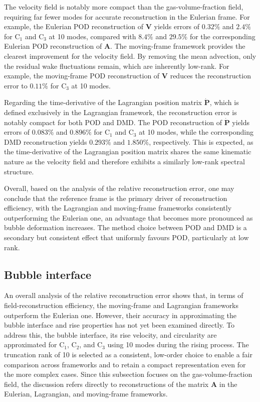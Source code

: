 \documentclass[a4paper,fleqn]{cas-sc}
\begin{document}
	The velocity field is notably more compact than the gas-volume-fraction field, requiring far fewer modes for accurate reconstruction in the Eulerian frame. For example, the Eulerian POD reconstruction of $\mathbf{V}$ yields errors of $0.32\%$ and $2.4\%$ for C$_1$ and C$_3$ at 10 modes, compared with $8.4\%$ and $29.5\%$ for the corresponding Eulerian POD reconstruction of $\mathbf{A}$. The moving-frame framework provides the clearest improvement for the velocity field. By removing the mean advection, only the residual wake fluctuations remain, which are inherently low-rank. For example, the moving-frame POD reconstruction of $\mathbf{V}$ reduces the reconstruction error to $0.11\%$ for C$_3$ at 10 modes.
	
	Regarding the time-derivative of the Lagrangian position matrix $\dot{\mathbf{P}}$, which is defined exclusively in the Lagrangian framework, the reconstruction error is notably compact for both POD and DMD. The POD reconstruction of $\dot{\mathbf{P}}$ yields errors of $0.083\%$ and $0.896\%$ for C$_1$ and C$_3$ at 10 modes, while the corresponding DMD reconstruction yields $0.293\%$ and $1.850\%$, respectively. This is expected, as the time-derivative of the Lagrangian position matrix shares the same kinematic nature as the velocity field and therefore exhibits a similarly low-rank spectral structure. 
	
	Overall, based on the analysis of the relative reconstruction error, one may conclude that the reference frame is the primary driver of reconstruction efficiency, with the Lagrangian and moving-frame frameworks consistently outperforming the Eulerian one, an advantage that becomes more pronounced as bubble deformation increases. The method choice between POD and DMD is a secondary but consistent effect that uniformly favours POD, particularly at low rank.
	
	\subsection{Bubble interface}
	\label{Bubble interface}
	An overall analysis of the relative reconstruction error shows that, in terms of field-reconstruction efficiency, the moving-frame and Lagrangian frameworks outperform the Eulerian one. However, their accuracy in approximating the bubble interface and rise properties has not yet been examined directly. To address this, the bubble interface, its rise velocity, and circularity are approximated for C$_1$, C$_2$, and C$_3$ using 10 modes during the rising process. The truncation rank of 10 is selected as a consistent, low-order choice to enable a fair comparison across frameworks and to retain a compact representation even for the more complex cases. Since this subsection focuses on the gas-volume-fraction field, the discussion refers directly to reconstructions of the matrix $\mathbf{A}$ in the Eulerian, Lagrangian, and moving-frame frameworks.
	
\end{document}
